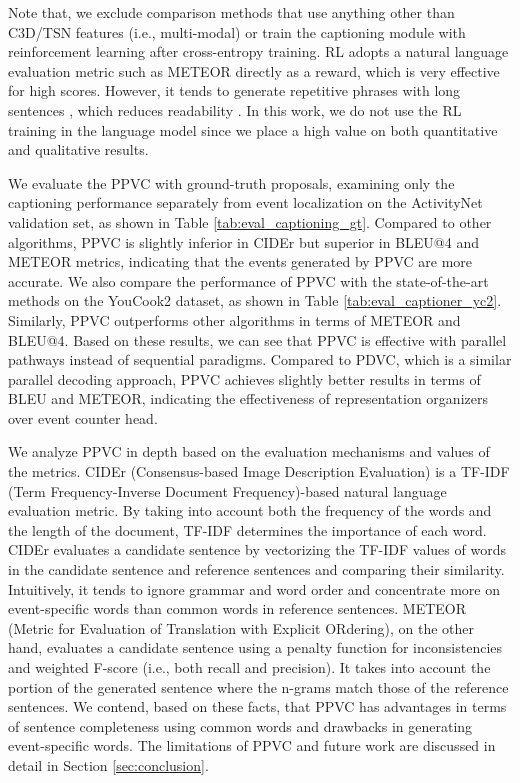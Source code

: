 Note that, we exclude comparison methods that use anything other than C3D/TSN features (i.e., multi-modal) or train the captioning module with reinforcement learning after cross-entropy training.
RL adopts a natural language evaluation metric such as METEOR directly as a reward, which is very effective for high scores. 
However, it tends to generate repetitive phrases with long sentences \cite{wang2019describing}, which reduces readability \cite{wang2018bidirectional,fujita2020soda}.
In this work, we do not use the RL training in the language model since we place a high value on both quantitative and qualitative results.

We evaluate the PPVC with ground-truth proposals, examining only the captioning performance separately from event localization on the ActivityNet validation set, as shown in Table \ref{tab:eval_captioning_gt}.
Compared to other algorithms, PPVC is slightly inferior in CIDEr but superior in BLEU@4 and METEOR metrics, indicating that the events generated by PPVC are more accurate.
We also compare the performance of PPVC with the state-of-the-art methods on the YouCook2 dataset, as shown in Table \ref{tab:eval_captioner_yc2}.
Similarly, PPVC outperforms other algorithms in terms of METEOR and BLEU@4.
Based on these results, we can see that PPVC is effective with parallel pathways instead of sequential paradigms.
Compared to PDVC, which is a similar parallel decoding approach, PPVC achieves slightly better results in terms of BLEU and METEOR, indicating the effectiveness of representation organizers over event counter head.

We analyze PPVC in depth based on the evaluation mechanisms and values of the metrics.
CIDEr (Consensus-based Image Description Evaluation) is a TF-IDF (Term Frequency-Inverse Document Frequency)-based natural language evaluation metric.
By taking into account both the frequency of the words and the length of the document, TF-IDF determines the importance of each word.
CIDEr evaluates a candidate sentence by vectorizing the TF-IDF values of words in the candidate sentence and reference sentences and comparing their similarity.
Intuitively, it tends to ignore grammar and word order and concentrate more on event-specific words than common words in reference sentences.
METEOR (Metric for Evaluation of Translation with Explicit ORdering), on the other hand, evaluates a candidate sentence using a penalty function for inconsistencies and weighted F-score (i.e., both recall and precision).
It takes into account the portion of the generated sentence where the n-grams match those of the reference sentences.
We contend, based on these facts, that PPVC has advantages in terms of sentence completeness using common words and drawbacks in generating event-specific words.
The limitations of PPVC and future work are discussed in detail in Section \ref{sec:conclusion}.


